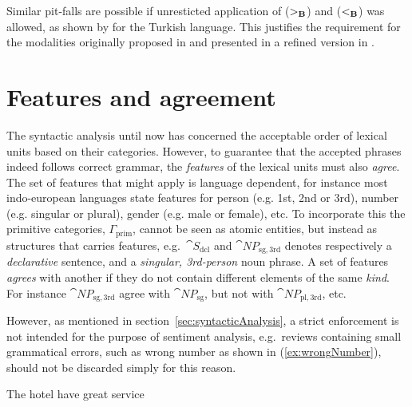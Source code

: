 Similar pit-falls are possible if unresticted application of ($>_{\bf B}$) and ($<_{\bf B}$) was allowed, as shown by \citeauthor{baldridgeThesis}  for the Turkish language. This justifies the requirement for the modalities \citeauthor{baldridgeThesis} originally proposed in  and \citeauthor{multiModalCCG} presented in a refined version in .

\section{Features and agreement}
The syntactic analysis until now has concerned the acceptable order of lexical units based on their categories. However, to guarantee that the accepted phrases indeed follows correct grammar, the \emph{features} of the lexical units must also \emph{agree}. The set of features that might apply is language dependent, for instance most indo-european languages state features for person (e.g. 1st, 2nd or 3rd), number (e.g. singular or plural), gender (e.g. male or female), etc. To incorporate this the primitive categories, $\Gamma_\mathrm{prim}$, cannot be seen as atomic entities, but instead as structures that carries features, e.g.\ $\cat{S_\mathrm{dcl}}$ and $\cat{NP}_\mathrm{sg,3rd}$ denotes respectively a \emph{declarative} sentence, and a \emph{singular, 3rd-person} noun phrase. A set of features \emph{agrees} with another if they do not contain different elements of the same \emph{kind}. For instance $\cat{NP}_\mathrm{sg,3rd}$ agree with $\cat{NP}_\mathrm{sg}$, but not with $\cat{NP}_\mathrm{pl,3rd}$, etc.

However, as mentioned in section~\ref{sec:syntacticAnalysis}, a strict enforcement is not intended for the purpose of sentiment analysis, e.g.\ reviews containing small grammatical errors, such as wrong number as shown in (\ref{ex:wrongNumber}), should not be discarded simply for this reason. 

\begin{numquote}
  The hotel have great service
  \label{ex:wrongNumber}
\end{numquote}

